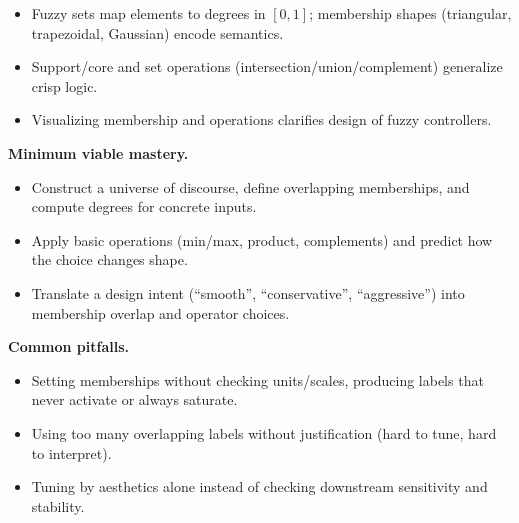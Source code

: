 \begin{tcolorbox}[summarybox, title={Key takeaways}]
\begin{itemize}
    \item Fuzzy sets map elements to degrees in \([0,1]\); membership shapes (triangular, trapezoidal, Gaussian) encode semantics.
    \item Support/core and set operations (intersection/union/complement) generalize crisp logic.
    \item Visualizing membership and operations clarifies design of fuzzy controllers.
\end{itemize}

\medskip
\noindent\textbf{Minimum viable mastery.}
\begin{itemize}
    \item Construct a universe of discourse, define overlapping memberships, and compute degrees for concrete inputs.
    \item Apply basic operations (min/max, product, complements) and predict how the choice changes shape.
    \item Translate a design intent (``smooth'', ``conservative'', ``aggressive'') into membership overlap and operator choices.
\end{itemize}

\noindent\textbf{Common pitfalls.}
\begin{itemize}
    \item Setting memberships without checking units/scales, producing labels that never activate or always saturate.
    \item Using too many overlapping labels without justification (hard to tune, hard to interpret).
    \item Tuning by aesthetics alone instead of checking downstream sensitivity and stability.
\end{itemize}
\end{tcolorbox}

